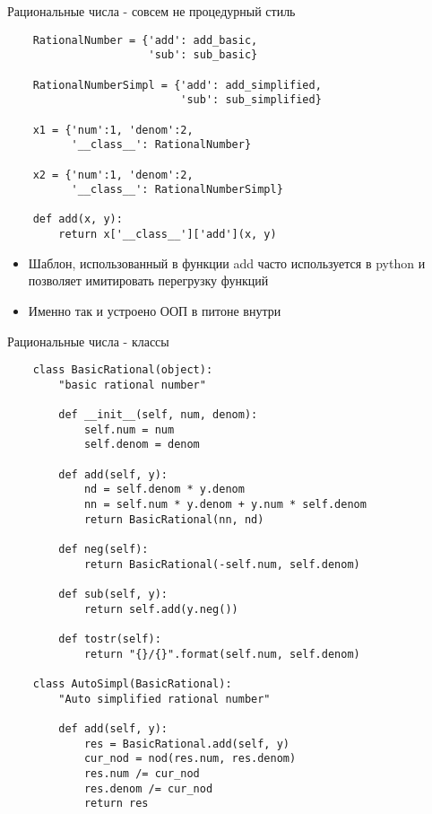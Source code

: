 \documentclass{article}
\begin{document}
\begin{center} Рациональные числа - совсем не процедурный стиль \end{center}
\begin{lstlisting}
    RationalNumber = {'add': add_basic, 
                      'sub': sub_basic}

    RationalNumberSimpl = {'add': add_simplified, 
                           'sub': sub_simplified}

    x1 = {'num':1, 'denom':2, 
          '__class__': RationalNumber}

    x2 = {'num':1, 'denom':2, 
          '__class__': RationalNumberSimpl}

    def add(x, y):
        return x['__class__']['add'](x, y)
\end{lstlisting}

\begin{itemize}
    \item Шаблон, использованный в функции add часто используется в 
          python и позволяет имитировать перегрузку функций
    \item Именно так и устроено ООП в питоне внутри
\end{itemize}
\newpage

\begin{center} Рациональные числа - классы \end{center}
\begin{lstlisting}
    class BasicRational(object):
        "basic rational number"

        def __init__(self, num, denom):
            self.num = num
            self.denom = denom

        def add(self, y):
            nd = self.denom * y.denom
            nn = self.num * y.denom + y.num * self.denom
            return BasicRational(nn, nd)

        def neg(self):
            return BasicRational(-self.num, self.denom)

        def sub(self, y):
            return self.add(y.neg())

        def tostr(self):
            return "{}/{}".format(self.num, self.denom)

    class AutoSimpl(BasicRational):
        "Auto simplified rational number"

        def add(self, y):
            res = BasicRational.add(self, y)
            cur_nod = nod(res.num, res.denom)
            res.num /= cur_nod
            res.denom /= cur_nod
            return res
\end{lstlisting}
\newpage
\end{document}
